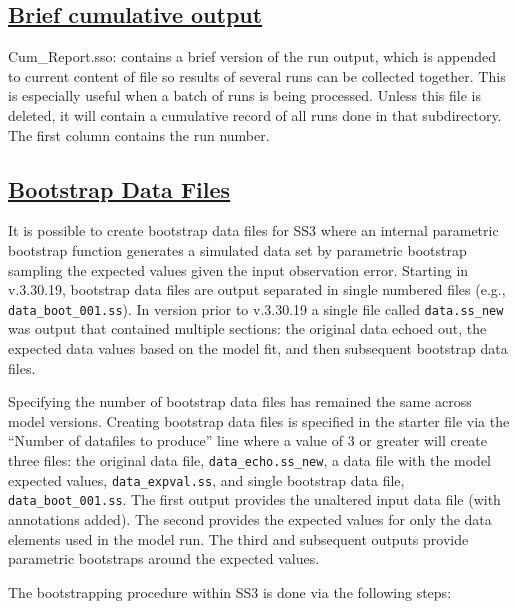\hypertarget{CumulativeOutput}{}
\subsection[Brief cumulative output]{\protect\hyperlink{CumulativeOutput}{Brief cumulative output}}
Cum\_Report.sso: contains a brief version of the run output, which is appended to current content of file so results of several runs can be collected together. This is especially useful when a batch of runs is being processed. Unless this file is deleted, it will contain a cumulative record of all runs done in that subdirectory. The first column contains the run number.  

\hypertarget{bootstrap}{}
\subsection[Bootstrap Data Files]{\protect\hyperlink{bootstrap}{Bootstrap Data Files}}
It is possible to create bootstrap data files for SS3 where an internal parametric bootstrap function generates a simulated data set by parametric bootstrap sampling the expected values given the input observation error. Starting in v.3.30.19, bootstrap data files are output separated in single numbered files (e.g., \texttt{data\_boot\_001.ss}). In version prior to v.3.30.19 a single file called \texttt{data.ss\_new} was output that contained multiple sections: the original data echoed out, the expected data values based on the model fit, and then subsequent bootstrap data files. 

Specifying the number of bootstrap data files has remained the same across model versions. Creating bootstrap data files is specified in the starter file via the ``Number of datafiles to produce'' line where a value of 3 or greater will create three files: the original data file, \texttt{data\_echo.ss\_new}, a data file with the model expected values, \texttt{data\_expval.ss}, and single bootstrap data file, \texttt{data\_boot\_001.ss}. The first output provides the unaltered input data file (with annotations added). The second provides the expected values for only the data elements used in the model run. The third and subsequent outputs provide parametric bootstraps around the expected values. 

The bootstrapping procedure within SS3 is done via the following steps:

